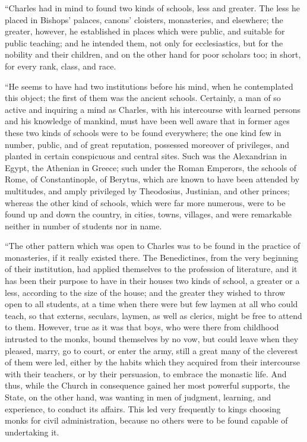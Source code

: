 ``Charles had in mind to
found two kinds of schools, less and greater. The less he placed in
Bishops' palaces, canons' cloisters, monasteries, and elsewhere; the
greater, however, he established in places which were public, and
suitable for public teaching; and he intended them, not only for
ecclesiastics, but for the nobility and their children, and on the
other hand for poor scholars too; in short, for every rank, class, and
race.

``He seems to have had two
institutions before his mind, when he contemplated this object; the
first of them was the ancient schools. Certainly, a man of so active
and inquiring a mind as Charles, with his intercourse with learned
persons and his knowledge of mankind, must have been well aware that
in former ages these two kinds of schools were to be found everywhere;
the one kind few in number, public, and of great reputation, possessed
moreover of privileges, and planted in certain conspicuous and central
sites. Such was the Alexandrian in Egypt, the Athenian in Greece; such
under the Roman Emperors, the schools of Rome, of Constantinople, of
Berytus, which are known to have been attended by multitudes, and
amply privileged by Theodosius, Justinian, and other princes; whereas
the other kind of schools, which were far more numerous, were to be
found up and down the country, in cities, towns, villages, and were
remarkable neither in number of students nor in name.

``The other pattern which was
open to Charles was to be found in the practice of monasteries, if it
really existed there. The Benedictines, from the very beginning of
their institution, had applied themselves to the profession of
literature, and it has been their purpose to have in their houses two
kinds of school, a greater or a less, according to the size of the
house; and the greater they wished to throw open to all students, at a
time when there were but few laymen at all who could teach, so that
externs, seculars, laymen, as well as clerics, might be free to attend
to them. However, true as it was that boys, who were there from
childhood intrusted to the monks, bound themselves by no vow, but
could leave when they pleased, marry, go to court, or enter the army,
still a great many of the cleverest of them were led, either by the
habits which they acquired from their intercourse with their teachers,
or by their persuasion, to embrace the monastic life. And thus, while
the Church in consequence gained her most powerful supports, the
State, on the other hand, was wanting in men of judgment, learning,
and experience, to conduct its affairs. This led very frequently to
kings choosing monks for civil administration, because no others were
to be found capable of undertaking it.


